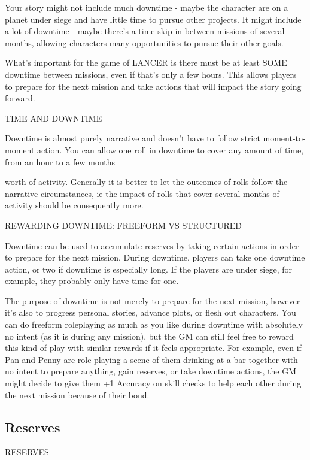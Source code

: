 Your story might not include much downtime - maybe the character are on a planet under siege  
and have little time to pursue other projects. It might include a lot of downtime - maybe there’s a  
time skip in between missions of several months, allowing characters many opportunities to  
pursue their other goals.
 

What’s important for the game of LANCER is there must be at least SOME downtime between  
missions, even if that’s only a few hours. This allows players to prepare for the next mission and  
take actions that will impact the story going forward.
 

                                           TIME AND DOWNTIME
 

Downtime is almost purely narrative and doesn’t have to follow strict moment-to-moment action.  
You can allow one roll in downtime to cover any amount of time, from an hour to a few months  

                                                                                                                


worth of activity. Generally it is better to let the outcomes of rolls follow the narrative  
circumstances, ie the impact of rolls that cover several months of activity should be  
consequently more.
 

                      REWARDING DOWNTIME: FREEFORM VS STRUCTURED
 

Downtime can be used to accumulate reserves by taking certain actions in order to prepare for  
the next mission. During downtime, players can take one downtime action, or two if downtime is  
especially long. If the players are under siege, for example, they probably only have time for one.
 

The purpose of downtime is not merely to prepare for the next mission, however - it’s also to  
progress personal stories, advance plots, or flesh out characters. You can do freeform  
roleplaying as much as you like during downtime with absolutely no intent (as it is during any  
mission), but the GM can still feel free to reward this kind of play with similar rewards if it  
feels appropriate. For example, even if Pan and Penny are role-playing a scene of them drinking  
at a bar together with no intent to prepare anything, gain reserves, or take downtime actions, the  
GM might decide to give them +1 Accuracy on skill checks to help each other during the next  
mission because of their bond.
 

\subsection{Reserves}
                                                 RESERVES  

